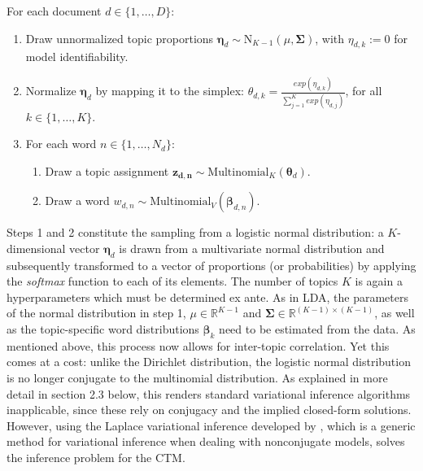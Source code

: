 \documentclass[12pt]{article}
\begin{document}
\vspace{0.25cm}
\noindent
For each document $d \in \{1,\dots,D\}$:

\begin{enumerate}[{1)}]
\vspace{-0.25cm}
\item Draw unnormalized topic proportions $\boldsymbol{\eta}_d \sim \text{N}_{K-1}(\mu, \boldsymbol{\Sigma})$, with $\eta_{d,k} := 0$ for model identifiability.
\vspace{-0.25cm}
\item Normalize $\boldsymbol{\eta}_d$ by mapping it to the simplex: $\theta_{d,k} = \frac{exp(\eta_{d,k})}{\sum_{j=1}^{K}exp(\eta_{d,j})}$, for all $k \in \{1,\dots,K\}$.
\vspace{-0.25cm}
\item For each word $n \in \{1,\dots,N_d\}$:
	\begin{enumerate}[{a)}]
	\vspace{-0.25cm}    
    \item Draw a topic assignment $\boldsymbol{z_{d,n}} \sim \text{Multinomial}_K(\boldsymbol{\theta}_d)$.
	\vspace{-0.25cm}    
    \item Draw a word $w_{d,n} \sim \text{Multinomial}_V(\boldsymbol{\beta}_{d,n})$.
	\end{enumerate}
\end{enumerate}

\noindent
Steps 1 and 2 constitute the sampling from a logistic normal distribution: a $K$-dimensional vector $\boldsymbol{\eta}_d$ is drawn from a multivariate normal distribution and subsequently transformed to a vector of proportions (or probabilities) by applying the \textit{softmax} function to each of its elements. The number of topics $K$ is again a hyperparameters which must be determined ex ante. As in LDA, the parameters of the normal distribution in step 1, $\mu \in \mathbb{R}^{K-1}$ and $\boldsymbol{\Sigma} \in \mathbb{R}^{(K-1) \times (K-1)}$, as well as the topic-specific word distributions $\boldsymbol{\beta}_k$ need to be estimated from the data. As mentioned above, this process now allows for inter-topic correlation. Yet this comes at a cost: unlike the Dirichlet distribution, the logistic normal distribution is no longer conjugate to the multinomial distribution. As explained in more detail in section 2.3 below, this renders standard variational inference algorithms inapplicable, since these rely on conjugacy and the implied closed-form solutions. However, using the Laplace variational inference developed by \cite{wang2013variational}, which is a generic method for variational inference when dealing with nonconjugate models, solves the inference problem for the CTM.
\end{document}
